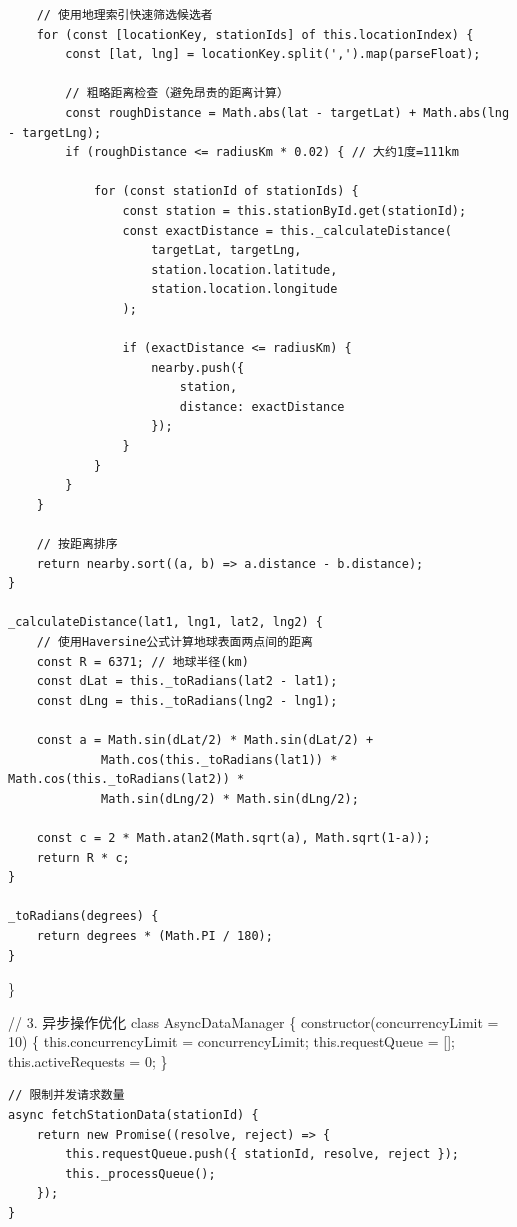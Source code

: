{{\begin{verbatim}
    // 使用地理索引快速筛选候选者
    for (const [locationKey, stationIds] of this.locationIndex) {
        const [lat, lng] = locationKey.split(',').map(parseFloat);
        
        // 粗略距离检查（避免昂贵的距离计算）
        const roughDistance = Math.abs(lat - targetLat) + Math.abs(lng - targetLng);
        if (roughDistance <= radiusKm * 0.02) { // 大约1度=111km
            
            for (const stationId of stationIds) {
                const station = this.stationById.get(stationId);
                const exactDistance = this._calculateDistance(
                    targetLat, targetLng, 
                    station.location.latitude, 
                    station.location.longitude
                );
                
                if (exactDistance <= radiusKm) {
                    nearby.push({
                        station,
                        distance: exactDistance
                    });
                }
            }
        }
    }
    
    // 按距离排序
    return nearby.sort((a, b) => a.distance - b.distance);
}

_calculateDistance(lat1, lng1, lat2, lng2) {
    // 使用Haversine公式计算地球表面两点间的距离
    const R = 6371; // 地球半径(km)
    const dLat = this._toRadians(lat2 - lat1);
    const dLng = this._toRadians(lng2 - lng1);
    
    const a = Math.sin(dLat/2) * Math.sin(dLat/2) +
             Math.cos(this._toRadians(lat1)) * Math.cos(this._toRadians(lat2)) *
             Math.sin(dLng/2) * Math.sin(dLng/2);
    
    const c = 2 * Math.atan2(Math.sqrt(a), Math.sqrt(1-a));
    return R * c;
}

_toRadians(degrees) {
    return degrees * (Math.PI / 180);
}
\end{verbatim}

\}

// 3. 异步操作优化 class AsyncDataManager \{ constructor(concurrencyLimit = 10) \{ this.concurrencyLimit = concurrencyLimit; this.requestQueue = {[}{]}; this.activeRequests = 0; \}

\begin{verbatim}
// 限制并发请求数量
async fetchStationData(stationId) {
    return new Promise((resolve, reject) => {
        this.requestQueue.push({ stationId, resolve, reject });
        this._processQueue();
    });
}


\end{verbatim}}}
